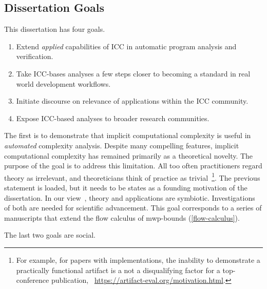 \subsection{Dissertation Goals}\label{subsec:specific-aims}

This dissertation has four goals.

\begin{enumerate}
\item Extend \emph{applied} capabilities of ICC in automatic program analysis and verification.
\item Take ICC-bases analyses a few steps closer to becoming a standard in real world development workflows.
\item Initiate discourse on relevance of applications within the ICC community.
\item Expose ICC-based analyses to broader research communities.
\end{enumerate}

The first is to demonstrate that implicit computational complexity is useful in \emph{automated} complexity analysis.
Despite many compelling features, implicit computational complexity has remained primarily as a theoretical novelty.
The purpose of the goal is to address this limitation.
All too often practitioners regard theory as irrelevant, and theoreticians think of practice as trivial~\cite[pg. xxxv]{bishop2003}\footnote{
For example, for papers with implementations, the inability to demonstrate a practically functional artifact is a not a disqualifying factor for a top-conference publication,
\cf\eg~\url{https://artifact-eval.org/motivation.html}.}.
The previous statement is loaded, but it needs to be states as a founding motivation of the dissertation.
In our view~\cite[p. 75]{moyen2017}, theory and applications are symbiotic.
Investigations of both are needed for scientific advancement.
This goal corresponds to a series of manuscripts that extend the flow calculus of mwp-bounds (\autoref{flow-calculus}).

The last two goals are social.


